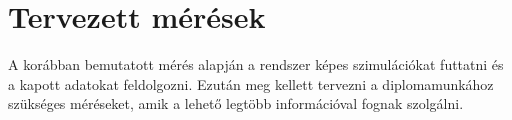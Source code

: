 





\section{Tervezett mérések}
A korábban bemutatott mérés alapján a rendszer képes szimulációkat futtatni és a kapott adatokat feldolgozni.
Ezután meg kellett tervezni a diplomamunkához szükséges méréseket, amik a lehető legtöbb információval fognak szolgálni.

